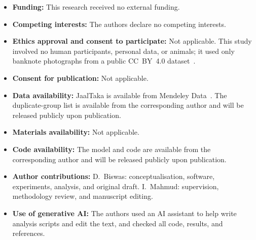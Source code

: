 \documentclass[pdflatex,sn-mathphys-num]{sn-jnl}
\begin{document}
\begin{itemize}
\item \textbf{Funding:} This research received no external funding.
\item \textbf{Competing interests:} The authors declare no competing interests.
\item \textbf{Ethics approval and consent to participate:} Not applicable. This study
involved no human participants, personal data, or animals; it used only banknote
photographs from a public CC~BY~4.0 dataset~\cite{jaaltaka_data}.
\item \textbf{Consent for publication:} Not applicable.
\item \textbf{Data availability:} JaalTaka is available from Mendeley
Data~\cite{jaaltaka_data}. The duplicate-group list is available from the corresponding
author and will be released publicly upon publication.
\item \textbf{Materials availability:} Not applicable.
\item \textbf{Code availability:} The model and code are available from the
corresponding author and will be released publicly upon publication.
\item \textbf{Author contributions:} D.~Biswas: conceptualisation, software,
experiments, analysis, and original draft. I.~Mahmud: supervision, methodology review,
and manuscript editing.
\item \textbf{Use of generative AI:} The authors used an AI assistant to help write
analysis scripts and edit the text, and checked all code, results, and references.
\end{itemize}


\end{document}
